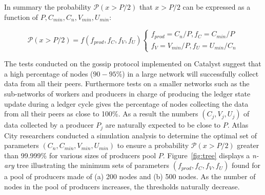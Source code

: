 In summary the probability $\mathcal{P}(x>P/2)$ that $x >P/2$ can be expressed as a function of $P, C_{min} ,C_n, V_{min}, U_{min}$:
\begin{center}
\[
  \mathcal{P}(x>P/2) = f(f_{prod}, f_C, f_V, f_U)\begin{cases}
               f_{prod} = C_n/P, f_C = C_{min}/P\\
               f_V = V_{min}/P, f_{U} = U_{min}/C_n
            \end{cases}
\]
\end{center}
The tests conducted on the gossip protocol implemented on Catalyst suggest that a high percentage of nodes ($90-95\%$) in a large network will successfully collect data from all their peers. Furthermore tests on a smaller networks such as the sub-networks  of workers and producers in charge of producing the ledger state update during a ledger cycle gives the percentage of nodes collecting the data from all their peers as close to 100\%. As a result the numbers $(C_{j} ,V_{j}, U_{j})$ of data collected by a producer $P_j$ are naturally expected to be close to $P$. Atlas City researchers conducted a simulation analysis to determine the optimal set of parameters $(C_n, C_{min}, V_{min}, U_{min})$ to ensure a probability $\mathcal{P}(x>P/2)$ greater than 99.999\% for various sizes of producers pool $P$. 
Figure~\ref{fig:tree} displays a \textit{n-ary} tree illustrating the minimum sets of parameters $(f_{prod}, f_C, f_V, f_U)$ found for a pool of producers made of (a) 200 nodes and (b) 500 nodes. As the number of nodes in the pool of producers increases, the thresholds naturally decrease. 

